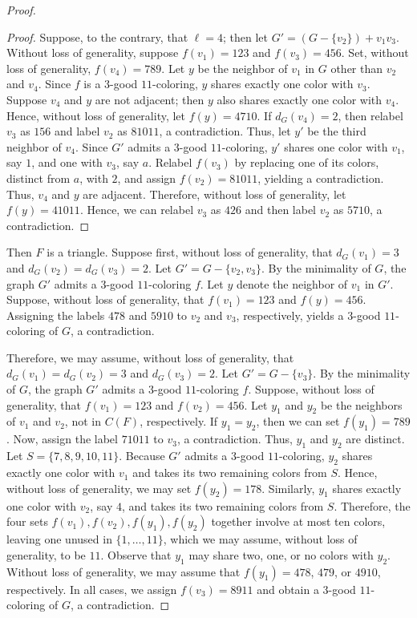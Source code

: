 \documentclass[10pt,a4paper]{amsart}
\begin{document}
\begin{proof}
\begin{proof}
Suppose, to the contrary, that $\ell= 4$; then let $G' = (G - \{v_2\}) + v_1v_3$. Without loss of generality, suppose $f(v_1) = 123$ and $f(v_3) = 456$. Set, without loss of generality, $f(v_4) = 789$. Let $y$ be the neighbor of $v_1$ in $G$ other than $v_2$ and $v_4$. Since $f$ is a $3$-good $11$-coloring, $y$ shares exactly one color with $v_3$. Suppose $v_4$ and $y$ are not adjacent; then $y$ also shares exactly one color with $v_4$. Hence, without loss of generality, let $f(y) = 4710$. If $d_G(v_4)=2$, then relabel $v_3$ as $156$ and label $v_2$ as $81011$, a contradiction. Thus, let $y'$ be the third neighbor of $v_4$. Since $G'$ admits a $3$-good $11$-coloring, $y'$ shares one color with $v_1$, say $1$, and one with $v_3$, say $a$. Relabel $f(v_3)$ by replacing one of its colors, distinct from $a$, with $2$, and assign $f(v_2)=81011$, yielding a contradiction. Thus, $v_4$ and $y$ are adjacent. Therefore, without loss of generality, let $f(y) = 41011$. Hence, we can relabel $v_3$ as $426$ and then label $v_2$ as $5710$, a contradiction.\end{proof}

\noindent Then $F$ is a triangle. Suppose first, without loss of generality, that $d_G(v_1)=3$ and $d_G(v_2)=d_G(v_3)=2$. Let $G' = G - \{v_2, v_3\}$. By the minimality of $G$, the graph $G'$ admits a $3$-good $11$-coloring $f$. Let $y$ denote the neighbor of $v_1$ in $G'$. Suppose, without loss of generality, that $f(v_1)=123$ and $f(y)=456$. Assigning the labels $478$ and $5910$ to $v_2$ and $v_3$, respectively, yields a $3$-good $11$-coloring of $G$, a contradiction.

\noindent Therefore, we may assume, without loss of generality, that $d_G(v_1)=d_G(v_2)=3$ and $d_G(v_3)=2$. Let $G' = G - \{v_3\}$. By the minimality of $G$, the graph $G'$ admits a $3$-good $11$-coloring $f$. Suppose, without loss of generality, that $f(v_1)=123$ and $f(v_2)=456$. Let $y_1$ and $y_2$ be the neighbors of $v_1$ and $v_2$, not in $C(F)$, respectively. If $y_1=y_2$, then we can set $f(y_1)=789$. Now, assign the label $71011$ to $v_3$, a contradiction. Thus, $y_1$ and $y_2$ are distinct. Let $S=\{7,8,9,10,11\}$. Because $G'$ admits a $3$-good $11$-coloring, $y_2$ shares exactly one color with $v_1$ and takes its two remaining colors from $S$. Hence, without loss of generality, we may set $f(y_2) = 178$. Similarly, $y_1$ shares exactly one color with $v_2$, say $4$, and takes its two remaining colors from $S$. Therefore, the four sets $f(v_1), f(v_2), f(y_1), f(y_2)$ together involve at most ten colors, leaving one unused in $\{1,\dots,11\}$, which we may assume, without loss of generality, to be $11$. Observe that $y_1$ may share two, one, or no colors with $y_2$. Without loss of generality, we may assume that $f(y_1) = 478$, $479$, or $4910$, respectively. In all cases, we assign $f(v_3) = 8911$ and obtain a $3$-good $11$-coloring of $G$, a contradiction.\end{proof}
\end{document}
